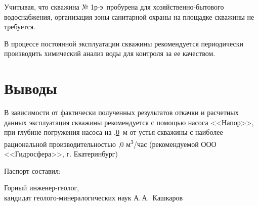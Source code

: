 \documentclass[a4paper,12pt]{article} %
\newcommand{\txtExecutor}{ООО <<Гидросфера>>}	%
\newcommand{\txtNumber}{№ 1р-э}  				%
\newcommand{\txtPump}{<<Напор>>}  				%
\newcommand{\txtDebit}{,0}						%
\newcommand{\txtPumpDepth}{,0}				%
\begin{document}
Учитывая, что скважина \txtNumber \, пробурена для хозяйственно-бытового водоснабжения, организация зоны санитарной охраны на площадке скважины не требуется.

В процессе постоянной эксплуатации скважины рекомендуется периодически производить химический анализ воды для контроля за ее качеством.

\section*{Выводы}

В зависимости от фактически полученных результатов откачки и расчетных данных эксплуатация скважины рекомендуется с помощью насоса  \txtPump, при глубине погружения насоса  на \underline{\txtPumpDepth} \,м от устья скважины с наиболее рациональной производительностью 	{\txtDebit} м\textsuperscript{3}/час (рекомендуемой \txtExecutor, г. Екатеринбург)

\bigskip

Паспорт составил:

\bigskip

\begin{minipage}{1.0\textwidth}
	Горный инженер-геолог,\\
	кандидат геолого-минералогических наук 
	А.\,А.~Кашкаров
\end{minipage}
\end{document}
